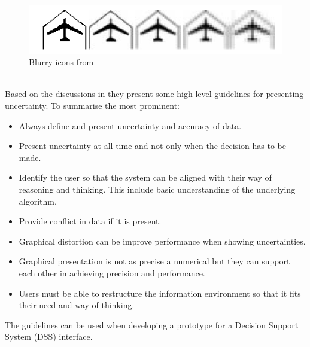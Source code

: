 \begin{figure}[h!]
\centering
\includegraphics[width=0.7\linewidth,natwidth=898,natheight=587]{billeder/blurryIcons.png}
\caption{Blurry icons from \cite{UncertainInformation}}
\label{fig:blurryIcons}
\end{figure}  
\\[0.5cm]
Based on the discussions in \cite{UncertainInformation} they present some high level guidelines for presenting uncertainty. To summarise the most prominent:
\begin{itemize}
\item Always define and present uncertainty and accuracy of data.
\item Present uncertainty at all time and not only when the decision has to be made.
\item Identify the user so that the system can be aligned with their way of reasoning and thinking. This include basic understanding of the underlying algorithm.
\item Provide conflict in data if it is present.
\item Graphical distortion can be improve performance when showing uncertainties.
\item Graphical presentation is not as precise a numerical but they can support each other in achieving precision and performance.
\item Users must be able to restructure the information environment so that it fits their need and way of thinking.
\end{itemize}
The guidelines can be used when developing a prototype for a Decision Support System (DSS) interface.